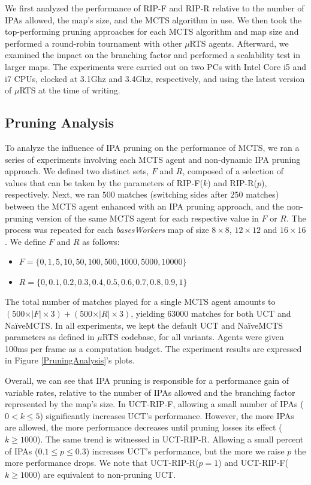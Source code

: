 \documentclass[conference]{IEEEtran}
\newcommand{\mRTS}{$\mu$RTS}
\begin{document}
We first analyzed the performance of RIP-F and RIP-R relative to the number of IPAs allowed, the map's size, and the MCTS algorithm in use. We then took the top-performing pruning approaches for each MCTS algorithm and map size and performed a round-robin tournament with other \mRTS{} agents. Afterward, we examined the impact on the branching factor and performed a scalability test in larger maps. The experiments were carried out on two PCs with Intel Core i5 and i7 CPUs, clocked at 3.1Ghz and 3.4Ghz, respectively, and using the latest version of \mRTS{} at the time of writing.


\subsection{Pruning Analysis}

To analyze the influence of IPA pruning on the performance of MCTS, we ran a series of experiments involving each MCTS agent and non-dynamic IPA pruning approach. We defined two distinct sets, $F$ and $R$, composed of a selection of values that can be taken by the parameters of RIP-F($k$) and RIP-R($p$), respectively. Next, we ran $500$ matches (switching sides after $250$ matches) between the MCTS agent enhanced with an IPA pruning approach, and the non-pruning version of the same MCTS agent for each respective value in $F$ or $R$. The process was repeated for each \textit{basesWorkers} map of size $8\times8$, $12\times12$ and $16\times16$. We define $F$ and $R$ as follows:

\begin{itemize}
\item $F = \{0, 1, 5, 10, 50, 100, 500, 1000, 5000, 10000\}$
\item $R = \{0, 0.1, 0.2, 0.3, 0.4, 0.5, 0.6, 0.7, 0.8, 0.9, 1\}$
\end{itemize}

The total number of matches played for a single MCTS agent amounts to $(500\times\vert F\vert\times3) + (500\times\vert R\vert\times3)$, yielding $63000$ matches for both UCT and NaïveMCTS. In all experiments, we kept the default UCT and NaïveMCTS parameters as defined in \mRTS{} codebase, for all variants. Agents were given 100ms per frame as a computation budget. The experiment results are expressed in Figure \ref{PruningAnalysis}'s plots.

Overall, we can see that IPA pruning is responsible for a performance gain of variable rates, relative to the number of IPAs allowed and the branching factor represented by the map's size. In UCT-RIP-F, allowing a small number of IPAs ($0 < k \leq 5$) significantly increases UCT's performance. However, the more IPAs are allowed, the more performance decreases until pruning losses its effect ($k \geq 1000$). The same trend is witnessed in UCT-RIP-R. Allowing a small percent of IPAs ($0.1 \leq p \leq 0.3$) increases UCT's performance, but the more we raise $p$ the more performance drops. We note that UCT-RIP-R($p=1$) and UCT-RIP-F($k \geq 1000$) are equivalent to non-pruning UCT.
\end{document}

